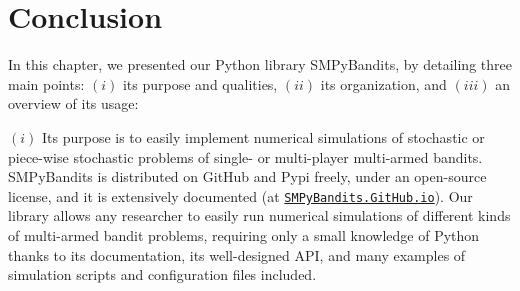






\newpage  %
\section{Conclusion}
\label{sec:3:conclusion}


In this chapter, we presented our Python library SMPyBandits, by detailing three main points:
$(i)$ its purpose and qualities,
$(ii)$ its organization,
and $(iii)$ an overview of its usage:
%

$(i)$
Its purpose is to easily implement numerical simulations of stochastic or piece-wise stochastic problems of single- or multi-player multi-armed bandits.
SMPyBandits is distributed on GitHub and Pypi freely, under an open-source license, and it is extensively documented (at \href{https://SMPyBandits.GitHub.io}{\texttt{SMPyBandits.GitHub.io}}).
Our library allows any researcher to easily run numerical simulations of different kinds of multi-armed bandit problems, requiring only a small knowledge of Python thanks to its documentation, its well-designed API, and many examples of simulation scripts and configuration files included.

